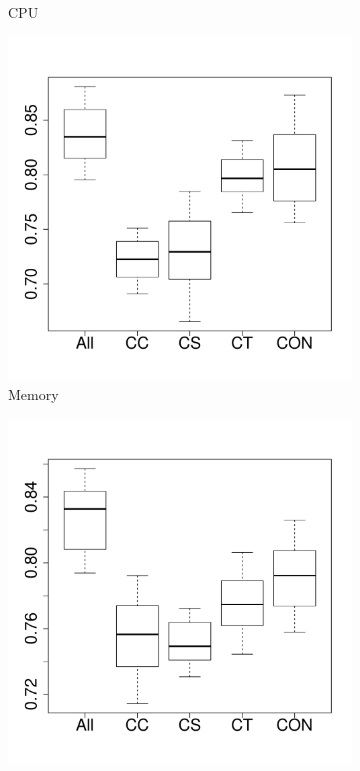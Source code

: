 \begin{figure}[t]
\begin{subfigure}{0.19\textwidth}
                \caption{CPU}
        \end{subfigure}%
        \begin{subfigure}{0.19\textwidth}
                \includegraphics[width=\linewidth]{Figures/mem-cassandrakeep-importance.pdf}
                \caption{Memory}
        \end{subfigure}%
        \begin{subfigure}{0.19\textwidth}
                \includegraphics[width=\linewidth]{Figures/ioread-cassandrakeep-importance.pdf}

\end{subfigure}
\end{figure}
